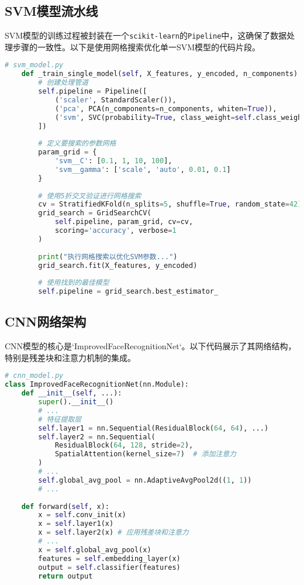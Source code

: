 \documentclass[a4paper]{article}
\begin{document}
\subsection{SVM模型流水线}
SVM模型的训练过程被封装在一个\texttt{scikit-learn}的\texttt{Pipeline}中，这确保了数据处理步骤的一致性。以下是使用网格搜索优化单一SVM模型的代码片段。
\begin{lstlisting}[language=Python, caption={SVM模型网格搜索与训练}]
    # svm_model.py
    def _train_single_model(self, X_features, y_encoded, n_components):
        # 创建处理管道
        self.pipeline = Pipeline([
            ('scaler', StandardScaler()),
            ('pca', PCA(n_components=n_components, whiten=True)),
            ('svm', SVC(probability=True, class_weight=self.class_weight))
        ])
        
        # 定义要搜索的参数网格
        param_grid = {
            'svm__C': [0.1, 1, 10, 100],
            'svm__gamma': ['scale', 'auto', 0.01, 0.1]
        }
        
        # 使用5折交叉验证进行网格搜索
        cv = StratifiedKFold(n_splits=5, shuffle=True, random_state=42)
        grid_search = GridSearchCV(
            self.pipeline, param_grid, cv=cv, 
            scoring='accuracy', verbose=1
        )
        
        print("执行网格搜索以优化SVM参数...")
        grid_search.fit(X_features, y_encoded)
        
        # 使用找到的最佳模型
        self.pipeline = grid_search.best_estimator_
\end{lstlisting}

\subsection{CNN网络架构}
CNN模型的核心是`ImprovedFaceRecognitionNet`。以下代码展示了其网络结构，特别是残差块和注意力机制的集成。
\begin{lstlisting}[language=Python, caption={改进的CNN网络架构}]
# cnn_model.py
class ImprovedFaceRecognitionNet(nn.Module):
    def __init__(self, ...):
        super().__init__()
        # ...
        # 特征提取层
        self.layer1 = nn.Sequential(ResidualBlock(64, 64), ...)
        self.layer2 = nn.Sequential(
            ResidualBlock(64, 128, stride=2),
            SpatialAttention(kernel_size=7)  # 添加注意力
        )
        # ...
        self.global_avg_pool = nn.AdaptiveAvgPool2d((1, 1))
        # ...
    
    def forward(self, x):
        x = self.conv_init(x)
        x = self.layer1(x)
        x = self.layer2(x) # 应用残差块和注意力
        # ...
        x = self.global_avg_pool(x)
        features = self.embedding_layer(x)
        output = self.classifier(features)
        return output
\end{lstlisting}
\end{document}
